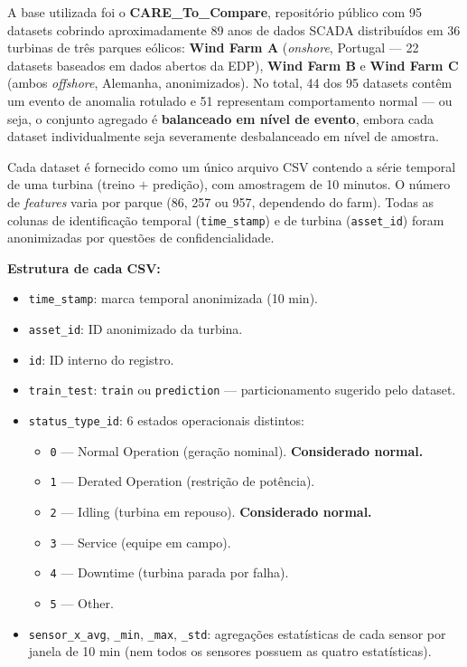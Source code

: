 \documentclass[12pt]{article}
\begin{document}
A base utilizada foi o \textbf{CARE\_To\_Compare}, repositório público com 95 datasets cobrindo aproximadamente 89 anos de dados SCADA distribuídos em 36 turbinas de três parques eólicos: \textbf{Wind Farm A} (\textit{onshore}, Portugal --- 22 datasets baseados em dados abertos da EDP), \textbf{Wind Farm B} e \textbf{Wind Farm C} (ambos \textit{offshore}, Alemanha, anonimizados). No total, 44 dos 95 datasets contêm um evento de anomalia rotulado e 51 representam comportamento normal --- ou seja, o conjunto agregado é \textbf{balanceado em nível de evento}, embora cada dataset individualmente seja severamente desbalanceado em nível de amostra.

Cada dataset é fornecido como um único arquivo CSV contendo a série temporal de uma turbina (treino $+$ predição), com amostragem de 10 minutos. O número de \textit{features} varia por parque (86, 257 ou 957, dependendo do farm). Todas as colunas de identificação temporal (\texttt{time\_stamp}) e de turbina (\texttt{asset\_id}) foram anonimizadas por questões de confidencialidade.

\textbf{Estrutura de cada CSV:}
\begin{itemize}
    \item \texttt{time\_stamp}: marca temporal anonimizada (10 min).
    \item \texttt{asset\_id}: ID anonimizado da turbina.
    \item \texttt{id}: ID interno do registro.
    \item \texttt{train\_test}: \texttt{train} ou \texttt{prediction} --- particionamento sugerido pelo dataset.
    \item \texttt{status\_type\_id}: 6 estados operacionais distintos:
    \begin{itemize}
        \item \texttt{0} --- Normal Operation (geração nominal). \textbf{Considerado normal.}
        \item \texttt{1} --- Derated Operation (restrição de potência).
        \item \texttt{2} --- Idling (turbina em repouso). \textbf{Considerado normal.}
        \item \texttt{3} --- Service (equipe em campo).
        \item \texttt{4} --- Downtime (turbina parada por falha).
        \item \texttt{5} --- Other.
    \end{itemize}
    \item \texttt{sensor\_x\_avg}, \texttt{\_min}, \texttt{\_max}, \texttt{\_std}: agregações estatísticas de cada sensor por janela de 10 min (nem todos os sensores possuem as quatro estatísticas).
\end{itemize}
\end{document}
